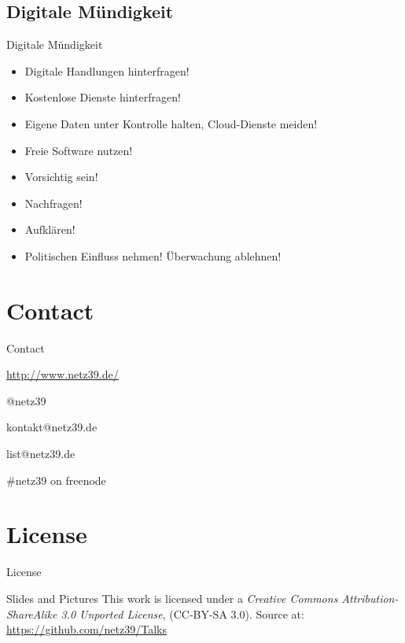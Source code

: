 \documentclass{beamer}
\begin{document}
\subsection{Digitale Mündigkeit}

\begin{frame}{Digitale Mündigkeit}
    \begin{itemize}
        \item Digitale Handlungen hinterfragen!
        \item Kostenlose Dienste hinterfragen!
        \item Eigene Daten unter Kontrolle halten, Cloud-Dienste meiden!
        \item Freie Software nutzen!
        \item Vorsichtig sein!
        \item Nachfragen!
        \item Aufklären!
        \item Politischen Einfluss nehmen! Überwachung ablehnen!
    \end{itemize}
\end{frame}

\section{Contact}

\begin{frame}{Contact}
    \begin{center}
        \begin{description}
            \item[WWW] \url{http://www.netz39.de/}
            \item[Twitter/identi.ca] @netz39
            \item[E-Mail] kontakt@netz39.de
            \item[Mailingliste] list@netz39.de
            \item[IRC] \#netz39 on freenode
        \end{description}
    \end{center}
\end{frame}

\appendix

\section{License}

\begin{frame}{License}
    \begin{block}{Slides and Pictures}
        This work is licensed under a \emph{Creative Commons
        Attribution-ShareAlike 3.0 Unported License}, (CC-BY-SA 3.0).
        Source at: \url{https://github.com/netz39/Talks}
    \end{block}
\end{frame}
\end{document}

